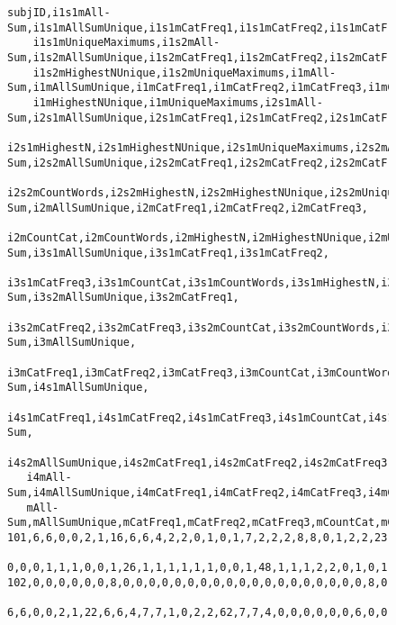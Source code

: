 \documentclass[11pt]{article}
\numberwithin{figure}{section}
\numberwithin{table}{section}
\begin{document}
\begin{figure}
\begin{verbatim}
subjID,i1s1mAll-Sum,i1s1mAllSumUnique,i1s1mCatFreq1,i1s1mCatFreq2,i1s1mCatFreq3,i1s1mCountCat,i1s1mCountWords,i1s1mHighestN,i1s1mHighestNUnique,
    i1s1mUniqueMaximums,i1s2mAll-Sum,i1s2mAllSumUnique,i1s2mCatFreq1,i1s2mCatFreq2,i1s2mCatFreq3,i1s2mCountCat,i1s2mCountWords,i1s2mHighestN,
    i1s2mHighestNUnique,i1s2mUniqueMaximums,i1mAll-Sum,i1mAllSumUnique,i1mCatFreq1,i1mCatFreq2,i1mCatFreq3,i1mCountCat,i1mCountWords,i1mHighestN,
    i1mHighestNUnique,i1mUniqueMaximums,i2s1mAll-Sum,i2s1mAllSumUnique,i2s1mCatFreq1,i2s1mCatFreq2,i2s1mCatFreq3,i2s1mCountCat,i2s1mCountWords,
    i2s1mHighestN,i2s1mHighestNUnique,i2s1mUniqueMaximums,i2s2mAll-Sum,i2s2mAllSumUnique,i2s2mCatFreq1,i2s2mCatFreq2,i2s2mCatFreq3,i2s2mCountCat,
    i2s2mCountWords,i2s2mHighestN,i2s2mHighestNUnique,i2s2mUniqueMaximums,i2mAll-Sum,i2mAllSumUnique,i2mCatFreq1,i2mCatFreq2,i2mCatFreq3,
    i2mCountCat,i2mCountWords,i2mHighestN,i2mHighestNUnique,i2mUniqueMaximums,i3s1mAll-Sum,i3s1mAllSumUnique,i3s1mCatFreq1,i3s1mCatFreq2,
    i3s1mCatFreq3,i3s1mCountCat,i3s1mCountWords,i3s1mHighestN,i3s1mHighestNUnique,i3s1mUniqueMaximums,i3s2mAll-Sum,i3s2mAllSumUnique,i3s2mCatFreq1,
    i3s2mCatFreq2,i3s2mCatFreq3,i3s2mCountCat,i3s2mCountWords,i3s2mHighestN,i3s2mHighestNUnique,i3s2mUniqueMaximums,i3mAll-Sum,i3mAllSumUnique,
    i3mCatFreq1,i3mCatFreq2,i3mCatFreq3,i3mCountCat,i3mCountWords,i3mHighestN,i3mHighestNUnique,i3mUniqueMaximums,i4s1mAll-Sum,i4s1mAllSumUnique,
   i4s1mCatFreq1,i4s1mCatFreq2,i4s1mCatFreq3,i4s1mCountCat,i4s1mCountWords,i4s1mHighestN,i4s1mHighestNUnique,i4s1mUniqueMaximums,i4s2mAll-Sum,
   i4s2mAllSumUnique,i4s2mCatFreq1,i4s2mCatFreq2,i4s2mCatFreq3,i4s2mCountCat,i4s2mCountWords,i4s2mHighestN,i4s2mHighestNUnique,i4s2mUniqueMaximums,
   i4mAll-Sum,i4mAllSumUnique,i4mCatFreq1,i4mCatFreq2,i4mCatFreq3,i4mCountCat,i4mCountWords,i4mHighestN,i4mHighestNUnique,i4mUniqueMaximums,
   mAll-Sum,mAllSumUnique,mCatFreq1,mCatFreq2,mCatFreq3,mCountCat,mCountWords,mHighestN,mHighestNUnique,mUniqueMaximums
101,6,6,0,0,2,1,16,6,6,4,2,2,0,1,0,1,7,2,2,2,8,8,0,1,2,2,23,8,8,4,6,6,0,0,2,1,12,6,6,4,5,5,2,0,1,2,18,5,5,3,11,11,2,0,3,2,30,10,11,4,0,0,0,0,0,0,22,
    0,0,0,1,1,1,0,0,1,26,1,1,1,1,1,1,0,0,1,48,1,1,1,2,2,0,1,0,1,28,2,2,2,11,11,0,1,3,2,31,11,11,4,13,11,0,2,3,2,59,11,11,4,33,22,3,3,8,3,160,12,15,4
102,0,0,0,0,0,0,8,0,0,0,0,0,0,0,0,0,0,0,0,0,0,0,0,0,0,0,8,0,0,0,6,6,0,0,2,1,34,6,6,4,0,0,0,0,0,0,21,0,0,0,6,6,0,0,2,1,55,6,6,4,1,1,1,0,0,1,40,1,1,1,
    6,6,0,0,2,1,22,6,6,4,7,7,1,0,2,2,62,7,7,4,0,0,0,0,0,0,6,0,0,0,10,10,1,0,3,2,30,10,10,4,10,10,1,0,3,2,36,10,10,4,23,16,2,0,7,2,161,12,15,4
\end{verbatim}
\end{figure}
\end{document}
